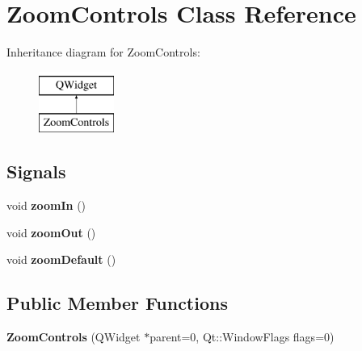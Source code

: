 \hypertarget{class_zoom_controls}{\section{Zoom\-Controls Class Reference}
\label{class_zoom_controls}
}
Inheritance diagram for Zoom\-Controls\-:\begin{figure}[H]
\begin{center}
\leavevmode
\includegraphics[height=2.000000cm]{class_zoom_controls}
\end{center}
\end{figure}
\subsection*{Signals}
\begin{DoxyCompactItemize}
\item 
\hypertarget{class_zoom_controls_a8e67ed52259c2a39ab3d226f938af5fd}{void {\bfseries zoom\-In} ()}\label{class_zoom_controls_a8e67ed52259c2a39ab3d226f938af5fd}

\item 
\hypertarget{class_zoom_controls_a879e2ad8afaf738cd2cde4b6eb9d29e4}{void {\bfseries zoom\-Out} ()}\label{class_zoom_controls_a879e2ad8afaf738cd2cde4b6eb9d29e4}

\item 
\hypertarget{class_zoom_controls_a2f2a13f9b17a2196fa16e8800ba9a896}{void {\bfseries zoom\-Default} ()}\label{class_zoom_controls_a2f2a13f9b17a2196fa16e8800ba9a896}

\end{DoxyCompactItemize}
\subsection*{Public Member Functions}
\begin{DoxyCompactItemize}
\item 
\hypertarget{class_zoom_controls_a2a165858e86d0aab0bbf25d225bcf913}{{\bfseries Zoom\-Controls} (Q\-Widget $\ast$parent=0, Qt\-::\-Window\-Flags flags=0)}\label{class_zoom_controls_a2a165858e86d0aab0bbf25d225bcf913}

\end{DoxyCompactItemize}


